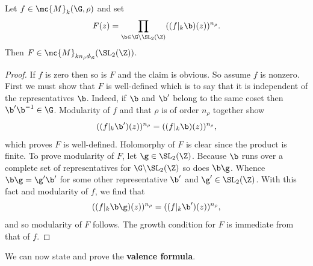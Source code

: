 \documentclass[12pt]{article}
\begin{document}
      \begin{lemma}\label{lem:lifting_lemma}
        Let \(f \in \mc{M}_{k}(\G,\rho)\) and set
        \[
          F(z) = \prod_{\b \in \G\backslash\SL_{2}(\Z)}((f|_{k}\b)(z))^{n_{\rho}}.
        \]
        Then \(F \in \mc{M}_{kn_{\rho}d_{\G}}(\SL_{2}(\Z))\).
      \end{lemma}
      \begin{proof}
        If \(f\) is zero then so is \(F\) and the claim is obvious. So assume \(f\) is nonzero. First we must show that \(F\) is well-defined which is to say that it is independent of the representatives \(\b\). Indeed, if \(\b\) and \(\b'\) belong to the same coset then \(\b'\b^{-1} \in \G\). Modularity of \(f\) and that \(\rho\) is of order \(n_{\rho}\) together show
        \[
          ((f|_{k}\b')(z))^{n_{\rho}} = ((f|_{k}\b)(z))^{n_{\rho}},
        \]
        which proves \(F\) is well-defined. Holomorphy of \(F\) is clear since the product is finite. To prove modularity of \(F\), let \(\g \in \SL_{2}(\Z)\). Because \(\b\) runs over a complete set of representatives for \(\G\backslash\SL_{2}(\Z)\) so does \(\b\g\). Whence \(\b\g = \g'\b'\) for some other representative \(\b'\) and \(\g' \in \SL_{2}(\Z)\). With this fact and modularity of \(f\), we find that
        \[
          ((f|_{k}\b\g)(z))^{n_{\rho}} = ((f|_{k}\b')(z))^{n_{\rho}},
        \]
        and so modularity of \(F\) follows. The growth condition for \(F\) is immediate from that of \(f\).
      \end{proof}  
      
      We can now state and prove the \textbf{valence formula}.
\end{document}
